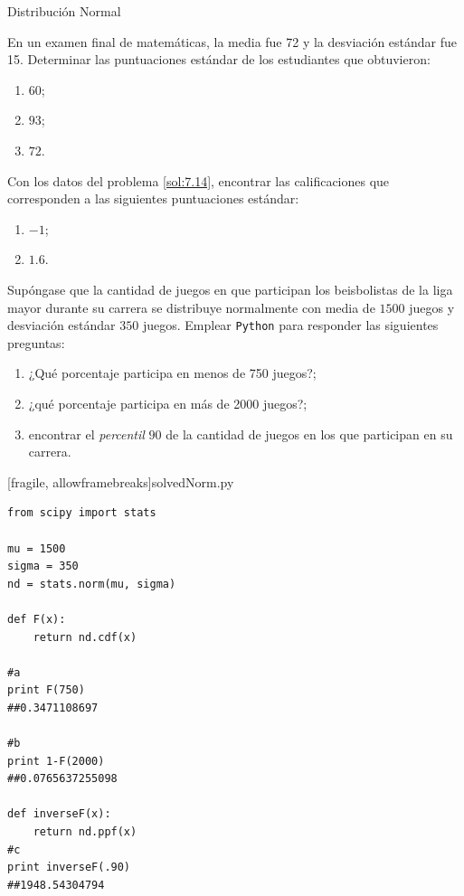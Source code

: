 {Distribución Normal}
 \begin{ejemplo}
  \label{sol:0.7.14}
  En un examen final de matemáticas, la media fue 72 y la desviación estándar fue 15. Determinar las puntuaciones estándar de los estudiantes que obtuvieron:
  \begin{enumerate}
   \item $60$;
   \item $93$;
   \item $72$.
  \end{enumerate}

 \end{ejemplo}



 \begin{ejemplo}
  \label{sol:0.7.15}
  Con los datos del problema \ref{sol:7.14}, encontrar las calificaciones que corresponden a las siguientes puntuaciones estándar:
  \begin{enumerate}
   \item $-1$;
   \item $1.6$.
  \end{enumerate}

 \end{ejemplo}



 \begin{ejemplo}
  \label{sol:0.7.16}
  Supóngase que la cantidad de juegos en que participan los beisbolistas de la liga mayor durante su carrera se distribuye normalmente con media de $1500$ juegos y desviación estándar $350$ juegos. Emplear \texttt{Python} para responder las siguientes preguntas:
  \begin{enumerate}
   \item ¿Qué porcentaje participa en menos de 750 juegos?;
   \item ¿qué porcentaje participa en más de 2000 juegos?;
   \item encontrar el \emph{percentil} $90$ de la cantidad de juegos en los que participan en su carrera.
  \end{enumerate}

 \end{ejemplo}


[fragile, allowframebreaks]{solvedNorm.py}
 \begin{verbatim}
from scipy import stats

mu = 1500
sigma = 350
nd = stats.norm(mu, sigma)

def F(x):
    return nd.cdf(x)

#a
print F(750)
##0.3471108697

#b
print 1-F(2000)
##0.0765637255098

def inverseF(x):
    return nd.ppf(x)
#c
print inverseF(.90)
##1948.54304794
 \end{verbatim}


